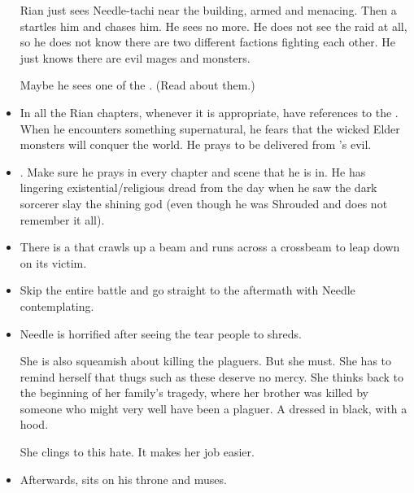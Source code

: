 \begin{changes}
\begin{itemize}
        Rian just sees Needle-tachi near the building, armed and menacing. 
        Then a \grimrat{} startles him and chases him. 
        He sees no more. 
        He does not see the raid at all, so he does not know there are two different factions fighting each other. 
        He just knows there are evil mages and monsters. 
        
        Maybe he sees one of the . 
        (Read about them.) 
      \item 
        In all the Rian chapters, whenever it is appropriate, have references to the . 
        When he encounters something supernatural, he fears that the wicked Elder monsters will conquer the world. 
        He prays to be delivered from \Isphet's evil. 
      \item 
        .
        Make sure he prays in every chapter and scene that he is in.
        He has lingering existential/religious dread from the day when he saw the dark sorcerer slay the shining god (even though he was Shrouded and does not remember it all). 
      \item 
        There is a \grimrat{} that crawls up a beam and runs across a crossbeam to leap down on its victim. 
      \item 
        Skip the entire battle and go straight to the aftermath with Needle contemplating. 
      \item 
        Needle is horrified after seeing the \grimrats{} tear people to shreds. 
        
        She is also squeamish about killing the plaguers. 
        But she must. 
        She has to remind herself that thugs such as these deserve no mercy. 
        She thinks back to the beginning of her family's tragedy, where her brother was killed by someone who might very well have been a plaguer. 
        A \scatha{} dressed in black, with a hood. 
        
        She clings to this hate. 
        It makes her job easier. 
      \item 
        Afterwards, \Psyrex{} sits on his throne and muses. 
        \begin{prose}
\end{prose}
\end{itemize}
\end{changes}
